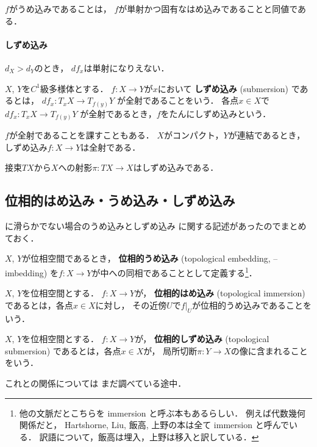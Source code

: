 \(f\)がうめ込みであることは，
\(f\)が単射かつ固有なはめ込みであることと同値である．

\paragraph{しずめ込み}

\(d_X> d_Y\)のとき，
\(df_x\)は単射になりえない．
\begin{DFN}
    \(X\), \(Y\)を\(C^1\)級多様体とする．
    \(f\colon X\to Y\)が\(x\)において
    \textbf{しずめ込み} (submersion) 
    であるとは，
    \(df_x\colon T_xX\to T_{f(y)}Y\)
    が全射であることをいう．
    各点\(x\in X\)で\(df_x\colon T_xX\to T_{f(y)}Y\)
    が全射であるとき，\(f\)をたんにしずめ込みという．
\end{DFN}
\(f\)が全射であることを課すこともある．
\(X\)がコンパクト，\(Y\)が連結であるとき，
しずめ込み\(f\colon X\to Y\)は全射である．

\begin{EG}
    接束\(TX\)から\(X\)への射影\(\pi\colon TX\to X\)はしずめ込みである．
\end{EG}

\subsection{位相的はめ込み・うめ込み・しずめ込み}
\cite{Le13}に滑らかでない場合のうめ込みとしずめ込み
に関する記述があったのでまとめておく．

\(X\), \(Y\)が位相空間であるとき，
\textbf{位相的うめ込み} (topological embedding, -- imbedding) 
を\(f\colon X\to Y\)が中への同相であることとして定義する\footnote{
    他の文脈だとこちらを immersion と呼ぶ本もあるらしい．
    例えば代数幾何関係だと，
    Hartshorne, Liu, 飯高, 上野の本は全て immersion と呼んでいる．
    訳語について，飯高は埋入，上野は移入と訳している．
}．

\begin{DFN}
    \(X\), \(Y\)を位相空間とする．
    \(f\colon X\to Y\)が，
    \textbf{位相的はめ込み} (topological immersion) 
    であるとは，各点\(x\in X\)に対し，
    その近傍\(U\)で\(f\rvert_U\)が位相的うめ込みであることをいう．
\end{DFN}
\begin{DFN}
    \(X\), \(Y\)を位相空間とする．
    \(f\colon X\to Y\)が，
    \textbf{位相的しずめ込み} (topological submersion) 
    であるとは，各点\(x\in X\)が，
    局所切断\(\pi\colon Y\to X\)の像に含まれることをいう．
\end{DFN}
これと\cite[Definition 3.3.1]{KS90}の関係については
まだ調べている途中．

